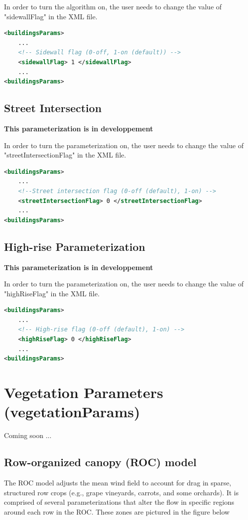 In order to turn the algorithm on, the user needs to change the value of "sidewallFlag" in the XML file.

\begin{lstlisting}[language=XML]
<buildingsParams>
	...
	<!-- Sidewall flag (0-off, 1-on (default)) -->
	<sidewallFlag> 1 </sidewallFlag>
	...
<buildingsParams>
\end{lstlisting}

\subsection{Street Intersection}

\textbf{This parameterization is in developpement}

In order to turn the parameterization on, the user needs to change the value of "streetIntersectionFlag" in the XML file.

\begin{lstlisting}[language=XML]
<buildingsParams>
	...
	<!--Street intersection flag (0-off (default), 1-on) -->
    <streetIntersectionFlag> 0 </streetIntersectionFlag>
	...
<buildingsParams>
\end{lstlisting}

\subsection{High-rise Parameterization}

\textbf{This parameterization is in developpement}

In order to turn the parameterization on, the user needs to change the value of "highRiseFlag" in the XML file.

\begin{lstlisting}[language=XML]
<buildingsParams>
	...
	<!-- High-rise flag (0-off (default), 1-on) -->
    <highRiseFlag> 0 </highRiseFlag>
	...
<buildingsParams>
\end{lstlisting}

\section{Vegetation Parameters (vegetationParams)}

Coming soon ...

\subsection{Row-organized canopy (ROC) model}
The ROC model adjusts the mean wind field to account for drag in sparse, structured row crops (e.g., grape vineyards, carrots, and some orchards). It is comprised of several parameterizations that alter the flow in specific regions around each row in the ROC. These zones are pictured in the figure below
